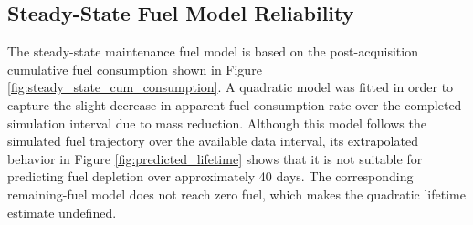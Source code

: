 \subsection{Steady-State Fuel Model Reliability}

The steady-state maintenance fuel model is based on the post-acquisition cumulative fuel consumption shown in Figure \ref{fig:steady_state_cum_consumption}. A quadratic model was fitted in order to capture the slight decrease in apparent fuel consumption rate over the completed simulation interval due to mass reduction. Although this model follows the simulated fuel trajectory over the available data interval, its extrapolated behavior in Figure \ref{fig:predicted_lifetime} shows that it is not suitable for predicting fuel depletion over approximately 40 days. The corresponding remaining-fuel model does not reach zero fuel, which makes the quadratic lifetime estimate undefined.

